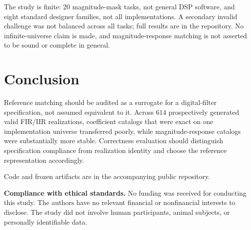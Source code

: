 \documentclass{article}
\begin{document}
The study is finite: 20 magnitude-mask tasks, not general DSP
software, and eight standard designer families, not all
implementations.
A secondary invalid challenge was not balanced across all tasks;
full results are in the repository.
No infinite-universe claim is made, and magnitude-response
matching is not asserted to be sound or complete in general.

\section{Conclusion}
\label{sec:conc}

Reference matching should be audited as a surrogate for a
digital-filter specification, not assumed equivalent to it.
Across $614$ prospectively generated valid FIR/IIR realizations,
coefficient catalogs that were exact on one implementation
universe transferred poorly, while magnitude-response catalogs
were substantially more stable.
Correctness evaluation should distinguish specification
compliance from realization identity and choose the reference
representation accordingly.

Code and frozen artifacts are in the accompanying public repository.

\clearpage
\noindent\textbf{Compliance with ethical standards.}
No funding was received for conducting this study.
The authors have no relevant financial or nonfinancial interests
to disclose.
The study did not involve human participants, animal subjects, or
personally identifiable data.



\end{document}

